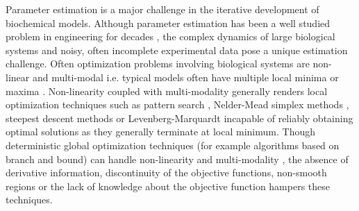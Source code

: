\documentclass[12pt]{article}
\begin{document}
Parameter estimation is a major challenge in the iterative development of biochemical models.
Although parameter estimation has been a well studied problem in engineering for decades \cite{nieman1971review,beck1977parameter,young1981parameter,beck1998inverse},
the complex dynamics of large biological systems and noisy, often incomplete experimental data pose a unique estimation challenge.
Often optimization problems involving biological systems are non-linear and multi-modal i.e. typical models often have multiple local minima or maxima \cite{moles2003parameter,banga2008optimization}.
Non-linearity coupled with multi-modality generally renders local optimization techniques such as pattern search \cite{hooke1961direct}, Nelder-Mead simplex methods \cite{nelder1965simplex},
steepest descent methods or Levenberg-Marquardt \cite{more1978levenberg} incapable of reliably obtaining optimal solutions as they generally terminate at local minimum.
Though deterministic global optimization techniques (for example algorithms based on branch and bound) can handle non-linearity and multi-modality \cite{esposito2000deterministic,horst2013global},
the absence of derivative information, discontinuity of the objective functions, non-smooth regions or the lack of knowledge about the objective function hampers these techniques.
\end{document}
